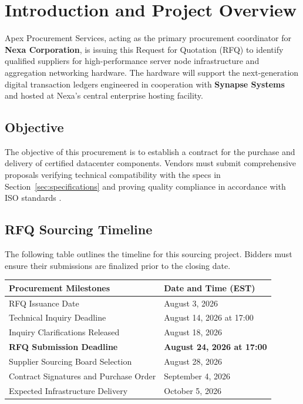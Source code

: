 \section{Introduction and Project Overview}
\label{sec:introduction}

Apex Procurement Services, acting as the primary procurement coordinator for \textbf{Nexa Corporation}, is issuing this Request for Quotation (RFQ) to identify qualified suppliers for high-performance server node infrastructure and aggregation networking hardware. The hardware will support the next-generation digital transaction ledgers engineered in cooperation with \textbf{Synapse Systems} and hosted at Nexa's central enterprise hosting facility.

\subsection{Objective}
The objective of this procurement is to establish a contract for the purchase and delivery of certified datacenter components. Vendors must submit comprehensive proposals verifying technical compatibility with the specs in Section~\ref{sec:specifications} and proving quality compliance in accordance with ISO standards \cite{iso9001}.

\subsection{RFQ Sourcing Timeline}
The following table outlines the timeline for this sourcing project. Bidders must ensure their submissions are finalized prior to the closing date.

\vspace{0.3cm}
\begin{tcolorbox}[rfqbox]
\begin{tabularx}{\textwidth}{L L}
    \textbf{Procurement Milestones} & \textbf{Date and Time (EST)} \\
    \midrule
    RFQ Issuance Date & August 3, 2026 \\
    Technical Inquiry Deadline & August 14, 2026 at 17:00 \\
    Inquiry Clarifications Released & August 18, 2026 \\
    \textbf{RFQ Submission Deadline} & \textbf{August 24, 2026 at 17:00} \\
    Supplier Sourcing Board Selection & August 28, 2026 \\
    Contract Signatures and Purchase Order & September 4, 2026 \\
    Expected Infrastructure Delivery & October 5, 2026 \\
    \bottomrule
\end{tabularx}
\end{tcolorbox}

